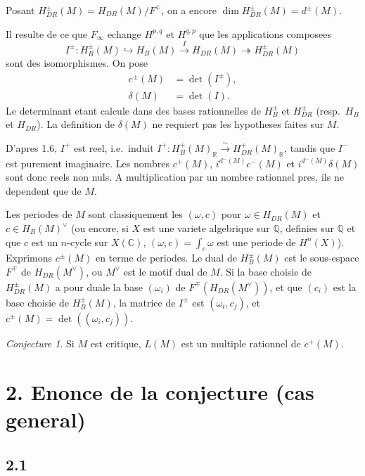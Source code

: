 \documentclass[12pt,a4paper]{article}
\theoremstyle{plain}
\theoremstyle{definition}
\theoremstyle{remark}
\newtheorem{conjecture}[definition]{Conjecture}
\newcommand{\Q}{\mathbb{Q}}
\newcommand{\R}{\mathbb{R}}
\newcommand{\C}{\mathbb{C}}
\begin{document}
Posant $H^\pm_{DR}(M) = H_{DR}(M)/F^\mp$, on a encore $\dim H^\pm_{DR}(M) = d^\pm(M)$.

Il resulte de ce que $F_\infty$ echange $H^{p,q}$ et $H^{q,p}$ que les applications composees
\begin{equation}\label{eq:1.7.1}
I^\pm: H^\pm_B(M) \hookrightarrow H_B(M) \xrightarrow{I} H_{DR}(M) \twoheadrightarrow H^\pm_{DR}(M)
\end{equation}
sont des isomorphismes. On pose
\begin{align}
c^\pm(M) &= \det(I^\pm), \label{eq:1.7.2}\\
\delta(M) &= \det(I). \label{eq:1.7.3}
\end{align}
Le determinant etant calcule dans des bases rationnelles de $H^\pm_B$ et $H^\pm_{DR}$
(resp.~$H_B$ et $H_{DR}$). La definition de $\delta(M)$ ne requiert pas les hypotheses faites sur $M$.

D'apres 1.6, $I^+$ est reel, i.e.~induit $I^+: H^+_B(M)_\R \xrightarrow{\sim} H^+_{DR}(M)_\R$,
tandis que $I^-$ est purement imaginaire. Les nombres $c^+(M)$, $i^{d^-(M)} c^-(M)$ et
$i^{d^-(M)} \delta(M)$ sont donc reels non nuls. A multiplication par un nombre rationnel
pres, ils ne dependent que de $M$.

Les periodes de $M$ sont classiquement les $(\omega, c)$ pour $\omega \in H_{DR}(M)$ et
$c \in H_B(M)^\vee$ (ou encore, si $X$ est une variete algebrique sur $\Q$, definies sur $\Q$
et que $c$ est un $n$-cycle sur $X(\C)$, $(\omega, c) = \int_c \omega$ est une periode de $H^n(X)$).
Exprimons $c^\pm(M)$ en terme de periodes. Le dual de $H^\pm_B(M)$ est le sous-espace
$F^\mp$ de $H_{DR}(M^\vee)$, ou $M^\vee$ est le motif dual de $M$. Si la base choisie de
$H^\pm_{DR}(M)$ a pour duale la base $(\omega_i)$ de $F^\mp(H_{DR}(M^\vee))$, et que $(c_i)$ est la
base choisie de $H^\pm_B(M)$, la matrice de $I^\pm$ est $(\omega_i, c_j)$, et
$c^\pm(M) = \det((\omega_i, c_j))$.

\begin{conjecture}\label{conj:1.8}
Si $M$ est critique, $L(M)$ est un multiple rationnel de $c^+(M)$.
\end{conjecture}


\section*{2. Enonce de la conjecture (cas general)}

\subsection*{2.1}
\end{document}
